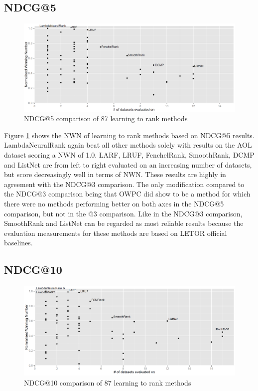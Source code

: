 \documentclass[english, authoryear, preprint]{elsarticle}
\begin{document}
\subsection{NDCG@5}
\begin{figure}
\centering
\includegraphics[scale=0.26]{gfx/ndcg5_winnum}
\caption{NDCG@5 comparison of 87 learning to rank methods}
\label{fig:normalized_winning_number_ndcg5}
\end{figure}
Figure \ref{fig:normalized_winning_number_ndcg5} shows the NWN of learning to rank methods based on NDCG@5 results. LambdaNeuralRank again beat all other methods solely with results on the AOL dataset scoring a NWN of 1.0. LARF, LRUF, FenchelRank, SmoothRank, DCMP and ListNet are from left to right evaluated on an increasing number of datasets, but score decreasingly well in terms of NWN. These results are highly in agreement with the NDCG@3 comparison. The only modification compared to the NDCG@3 comparison being that OWPC did show to be a method for which there were no methods performing better on both axes in the NDCG@5 comparison, but not in the @3 comparison. Like in the NDCG@3 comparison, SmoothRank and ListNet can be regarded as most reliable results because the evaluation measurements for these methods are based on LETOR official baselines.

\subsection{NDCG@10}
\begin{figure}
\centering
\includegraphics[scale=0.26]{gfx/ndcg10_winnum}
\caption{NDCG@10 comparison of 87 learning to rank methods}
\label{fig:normalized_winning_number_ndcg10}
\end{figure}
\end{document}
